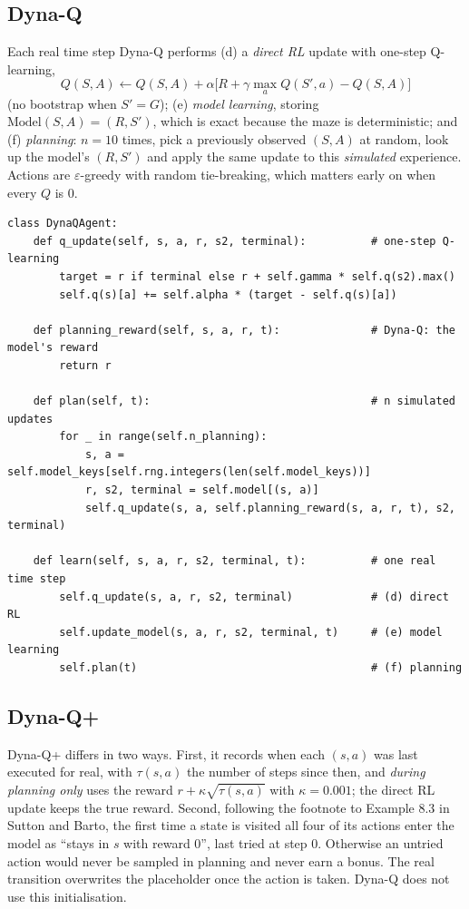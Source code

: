 \documentclass[11pt]{article}
\begin{document}
\subsection{Dyna-Q}
Each real time step Dyna-Q performs (d) a \emph{direct RL} update with one-step
Q-learning,
\[
Q(S,A) \leftarrow Q(S,A) + \alpha\bigl[R + \gamma \max_a Q(S',a) - Q(S,A)\bigr]
\]
(no bootstrap when $S' = G$); (e) \emph{model learning}, storing
$\text{Model}(S,A) = (R, S')$, which is exact because the maze is deterministic; and
(f) \emph{planning}: $n = 10$ times, pick a previously observed $(S,A)$ at random, look up the
model's $(R,S')$ and apply the same update to this \emph{simulated} experience. Actions are
$\varepsilon$-greedy with random tie-breaking, which matters early on when every $Q$ is 0.

\begin{lstlisting}
class DynaQAgent:
    def q_update(self, s, a, r, s2, terminal):          # one-step Q-learning
        target = r if terminal else r + self.gamma * self.q(s2).max()
        self.q(s)[a] += self.alpha * (target - self.q(s)[a])

    def planning_reward(self, s, a, r, t):              # Dyna-Q: the model's reward
        return r

    def plan(self, t):                                  # n simulated updates
        for _ in range(self.n_planning):
            s, a = self.model_keys[self.rng.integers(len(self.model_keys))]
            r, s2, terminal = self.model[(s, a)]
            self.q_update(s, a, self.planning_reward(s, a, r, t), s2, terminal)

    def learn(self, s, a, r, s2, terminal, t):          # one real time step
        self.q_update(s, a, r, s2, terminal)            # (d) direct RL
        self.update_model(s, a, r, s2, terminal, t)     # (e) model learning
        self.plan(t)                                    # (f) planning
\end{lstlisting}

\subsection{Dyna-Q+}
Dyna-Q+ differs in two ways. First, it records when each $(s,a)$ was last executed for real,
with $\tau(s,a)$ the number of steps since then, and \emph{during planning only} uses the reward
$r + \kappa\sqrt{\tau(s,a)}$ with $\kappa = 0.001$; the direct RL update keeps the true reward.
Second, following the footnote to Example 8.3 in Sutton and Barto, the first time a state is visited
all four of its actions enter the model as ``stays in $s$ with reward 0'', last tried at step 0.
Otherwise an untried action would never be sampled in planning and never earn a bonus. The real
transition overwrites the placeholder once the action is taken. Dyna-Q does not use this
initialisation.
\end{document}

